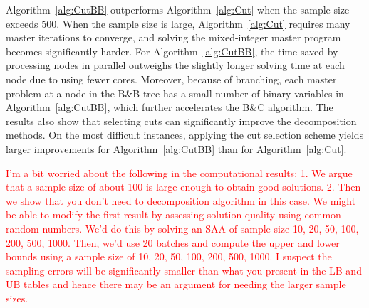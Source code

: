 \documentclass[11pt]{article}
\newcommand{\tcr}{\textcolor{red}}
\begin{document}
	Algorithm~\ref{alg:CutBB} outperforms Algorithm~\ref{alg:Cut} when the sample size exceeds 500. When the sample size is large, Algorithm~\ref{alg:Cut} requires many master iterations to converge, and solving the mixed-integer master program becomes significantly harder. For Algorithm~\ref{alg:CutBB}, the time saved by processing nodes in parallel outweighs the slightly longer solving time at each node due to using fewer cores. Moreover, because of branching, each master problem at a node in the B\&B tree has a small number of binary variables in Algorithm~\ref{alg:CutBB}, which further accelerates the B\&C algorithm. 
    The results also show that selecting cuts can significantly improve the decomposition methods.  On the most difficult instances, applying the cut selection scheme yields larger improvements for Algorithm~\ref{alg:CutBB} than for Algorithm~\ref{alg:Cut}. 
	
	\tcr{I'm a bit worried about the following in the computational results: 1. We argue that a sample size of about 100 is large enough to obtain good solutions. 2. Then  we show that you don't need to decomposition algorithm in this case.  We might be able to modify the first result by assessing solution quality using common random numbers. We'd do this by solving an SAA of sample size 10, 20, 50, 100, 200, 500, 1000. Then, we'd use 20 batches and compute the upper and lower bounds using a sample size of 10, 20, 50, 100, 200, 500, 1000. I suspect the sampling errors will be significantly smaller than what you present in the LB and UB tables and hence there may be an argument for needing the larger sample sizes.}
	
\end{document}
